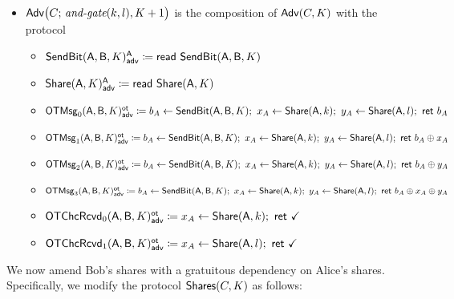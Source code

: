 \begin{itemize}
\item $\mathsf{Adv}\big(C; \, \textit{and-gate}(k,l),K+1\big)$ is the composition of $\mathsf{Adv}(C,K)$ with the protocol
\begin{itemize}
\item {\color{blue} $\mathsf{SendBit}(\mathsf{A},\mathsf{B},K)^{\mathsf{A}}_{\mathsf{adv}} \coloneqq \mathsf{read} \ \mathsf{SendBit}(\mathsf{A},\mathsf{B},K)$}
\item {\color{blue} $\mathsf{Share}(\mathsf{A},K)^{\mathsf{A}}_{\mathsf{adv}} \coloneqq \mathsf{read} \ \mathsf{Share}(\mathsf{A},K)$}\smallskip
\item {\color{blue} $\LeakOTMsg_0(\A,\B,K)^\ot_\adv \coloneqq b_A \leftarrow \SendBit(\A,\B,K); \ x_A \leftarrow \Share(\A,k); \ y_A \leftarrow \Share(\A,l); \ \ret{b_A}$}
\item {\color{blue} $\mathsf{OTMsg}_1(\mathsf{A},\mathsf{B},K)^{\mathsf{ot}}_{\mathsf{adv}} \coloneqq b_A \leftarrow \mathsf{SendBit}(\mathsf{A},\mathsf{B},K); \ x_A \leftarrow \mathsf{Share}(\mathsf{A},k); \ y_A \leftarrow \mathsf{Share}(\mathsf{A},l); \ \mathsf{ret} \ b_A \oplus x_A$}
\item {\color{blue} $\mathsf{OTMsg}_2(\mathsf{A},\mathsf{B},K)^{\mathsf{ot}}_{\mathsf{adv}} \coloneqq b_A \leftarrow \mathsf{SendBit}(\mathsf{A},\mathsf{B},K); \ x_A \leftarrow \mathsf{Share}(\mathsf{A},k); \ y_A \leftarrow \mathsf{Share}(\mathsf{A},l); \ \mathsf{ret} \ b_A \oplus y_A$}
\item {\color{blue} $\mathsf{OTMsg}_3(\mathsf{A},\mathsf{B},K)^{\mathsf{ot}}_{\mathsf{adv}} \coloneqq b_A \leftarrow \mathsf{SendBit}(\mathsf{A},\mathsf{B},K); \ x_A \leftarrow \mathsf{Share}(\mathsf{A},k); \ y_A \leftarrow \mathsf{Share}(\mathsf{A},l); \ \mathsf{ret} \ b_A \oplus x_A \oplus y_A$}\smallskip
\item {\color{blue} $\mathsf{OTChcRcvd}_0(\mathsf{A},\mathsf{B},K)^{\mathsf{ot}}_{\mathsf{adv}} \coloneqq x_A \leftarrow \mathsf{Share}(\mathsf{A},k); \ \mathsf{ret} \ \checkmark$}
\item {\color{blue} $\mathsf{OTChcRcvd}_1(\mathsf{A},\mathsf{B},K)^{\mathsf{ot}}_{\mathsf{adv}} \coloneqq x_A \leftarrow \mathsf{Share}(\mathsf{A},l); \ \mathsf{ret} \ \checkmark$}
\end{itemize}
\end{itemize}

\noindent We now amend Bob's shares with a gratuitous dependency on Alice's shares. Specifically, we modify the protocol $\mathsf{Shares}(C,K)$ as follows:

